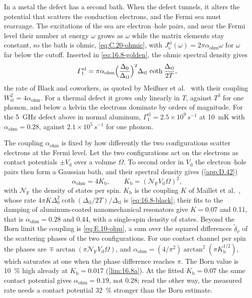 In a metal the defect has a second bath. When the defect tunnels, it alters the potential that scatters the conduction electrons, and the Fermi sea must rearrange. The excitations of the sea are electron--hole pairs, and near the Fermi level their number at energy $\omega$ grows as $\omega$ while the matrix elements stay constant, so the bath is ohmic, \cref{eq:C.20-ohmic}, with $J_{\mathrm{s}}^{\mathrm{el}}(\omega) = 2\pi\alpha_{\mathrm{ohm}}\omega$ for $\omega$ far below the cutoff. Inserted in \cref{eq:16.8-golden}, the ohmic spectral density gives
\begin{equation}
  \varGamma_1^{\mathrm{el}} = \pi\alpha_{\mathrm{ohm}}\Bigl(\frac{\Delta_0}{\Delta_{\mathrm{tl}}}\Bigr)^2\Delta_{\mathrm{tl}}\,\coth\frac{\Delta_{\mathrm{tl}}}{2T} ,
  \label{eq:16.8-black}
\end{equation}
the rate of Black and coworkers, as quoted by Meißner et al.~\cite[Eq.~(8)]{meissner2021acoustic} with their coupling $W_{\mathrm{el}}^2 = 4\alpha_{\mathrm{ohm}}$. For a thermal defect it grows only linearly in $T$, against $T^3$ for one phonon, and below a kelvin the electrons dominate by orders of magnitude. For the \SI{5}{GHz} defect above in normal aluminum, $\varGamma_1^{\mathrm{el}} = 2.5\times10^9\,\si{s^{-1}}$ at \SI{10}{mK} with $\alpha_{\mathrm{ohm}} = 0.28$, against $2.1\times10^5\,\si{s^{-1}}$ for one phonon.

The coupling $\alpha_{\mathrm{ohm}}$ is fixed by how differently the two configurations scatter electrons at the Fermi level. Let the two configurations act on the electrons as contact potentials $\pm V_{\mathrm{d}}$ over a volume $\Omega$. To second order in $V_{\mathrm{d}}$ the electron--hole pairs then form a Gaussian bath, and their spectral density gives (\cref{app:D.42})
\begin{equation}
  \alpha_{\mathrm{ohm}} = 4K_{\mathrm{b}} , \qquad K_{\mathrm{b}} = (\mathcal{N}_{\mathrm{F}}V_{\mathrm{d}}\Omega)^2 ,
  \label{eq:16.8-born}
\end{equation}
with $\mathcal{N}_{\mathrm{F}}$ the density of states per spin. $K_{\mathrm{b}}$ is the coupling $K$ of Maillet et al.~\cite[Eq.~(4)]{maillet2023nanomechanical}, whose rate $4\pi K\Delta_0^2\coth(\Delta_{\mathrm{tl}}/2T)/\Delta_{\mathrm{tl}}$ is \cref{eq:16.8-black}; their fits to the damping of aluminum-coated nanomechanical resonators give $K = 0.07$ and 0.11, that is $\alpha_{\mathrm{ohm}} = 0.28$ and 0.44, with a single-spin density of states. Beyond the Born limit the coupling is \cref{eq:E.10-ohm}, a sum over the squared differences $\tilde\delta_\nu$ of the scattering phases of the two configurations. For one contact channel per spin the phases are $\mp\arctan(\pi\mathcal{N}_{\mathrm{F}}V_{\mathrm{d}}\Omega)$, and $\alpha_{\mathrm{ohm}} = (4/\pi^2)\arctan^2(\pi K_{\mathrm{b}}^{1/2})$, which saturates at one when the phase difference reaches $\pi$. The Born value is \SI{10}{\percent} high already at $K_{\mathrm{b}} = 0.017$ (\cref{lim:16.8a}). At the fitted $K_{\mathrm{b}} = 0.07$ the same contact potential gives $\alpha_{\mathrm{ohm}} = 0.19$, not 0.28; read the other way, the measured rate needs a contact potential \SI{32}{\percent} stronger than the Born estimate.

